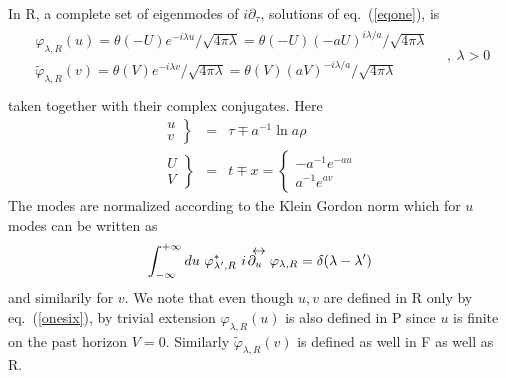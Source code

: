 \documentclass[12pt,oneside]{report}
\def\la{\lambda}
\def\lr #1{\mathrel{#1\kern-.75em\raise1.75ex\hbox{$\leftrightarrow$}}}
\begin{document}
In R, a complete set of eigenmodes 
of $i \partial_\tau$, solutions of eq.~(\ref{eqone}), is
\begin{eqnarray}
\begin{array}{c}
\varphi_{\la,R}(u) = \theta(-U){e^{-i \la u} /\sqrt{4 \pi \la}}
  =\theta(-U) {(-aU)^{i \la /a}   /\sqrt{4 \pi \la}}
 \\
\tilde \varphi_{\la,R} (v)= \theta(V) {e^{-i \la v} / \sqrt{4 \pi \la}}
= \theta(V) {(aV)^{-i \la /a }/\sqrt{4 \pi \la}}
\end{array}
\quad ,\ \la > 0\nonumber\\
\label{onefive}
\end{eqnarray}
taken together with their complex conjugates. Here
\begin{eqnarray}
\left.
\begin{array}{r}
u\\v
\end{array}
\right\} &=& \tau \mp a^{-1} \ln a \rho \label{onesix}\\
\left.
\begin{array}{r}
U\\V
\end{array}
\right\} &=& t \mp x = \left\{  
\begin{array}{l}
-a^{-1}e^{-au}\\a^{-1}e^{av}
\end{array}\right.
\label{onesixb}
\end{eqnarray}
The modes are normalized according to the Klein Gordon norm which for
$u$ modes can be written as
\begin{equation}
\int_{-\infty}^{+\infty} du\ 
\varphi_{\la^\prime,R}^*\  i \! \lr {\partial_u} \varphi_{\la,R}
= \delta(\la-\la^\prime)
\end{equation}
and similarily for $v$. We note that even though $u,v$ are defined 
in  R  only by eq.~(\ref{onesix}),
by trivial
extension $\varphi_{\la,R}(u)$ is also defined in P since $u$ is finite on the
past horizon $V=0$. Similarly  $\tilde \varphi_{\la,R}(v)$ is defined as well in
F as well as R. 
\end{document}
